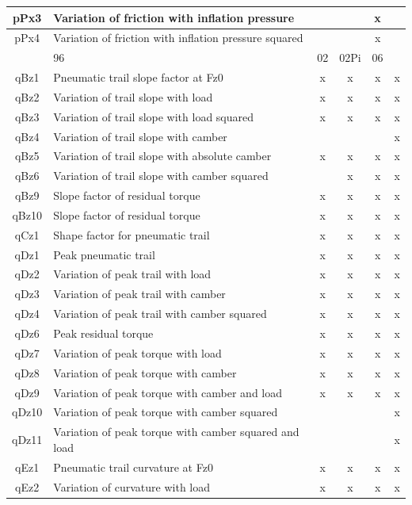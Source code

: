 \begin{center}
\begin{longtable}[c]{|c|p{4in}|cccc|}
			pPx3	&Variation of friction with inflation pressure 			&&&x&	\\ \hline
			pPx4	&Variation of friction with inflation pressure squared	&&&x&	\\ \hline
			\rowcolor{ttblue}\multicolumn{2}{|c|}{\cellcolor{ttblue}\textbf{Aligning Torque}}&96&	02& 02Pi&	06 \\ \hline
			qBz1	&Pneumatic trail slope factor at Fz0	&x	&x 	&x	&x\\ \hline
			qBz2	&Variation of trail slope with load	&x	&x &x	&x\\ \hline
			qBz3	&Variation of trail slope with load squared	&x 	&x	&x	&x\\ \hline
			qBz4	&Variation of trail slope with camber	&&&&x		\\ \hline
			qBz5	&Variation of trail slope with  absolute camber	&x &x	&x	&x\\ \hline
			qBz6	&Variation of trail slope with camber squared		&&x	 &x	&x\\ \hline
			qBz9	&Slope factor of residual torque	&x	&x 	&x	&x\\ \hline
			qBz10	&Slope factor of residual torque	&x	&x	&x	&x\\ \hline
			qCz1	&Shape factor for pneumatic trail	&x	&x 	&x	&x\\ \hline
			qDz1	&Peak pneumatic trail	&x	&x 	&x	&x\\ \hline
			qDz2	&Variation of peak trail with load 	&x	&x &x		&x\\ \hline
			qDz3	&Variation of peak trail with  camber	&x	&x &x	&x\\ \hline
			qDz4	&Variation of peak trail with camber squared	&x &x		&x	&x\\ \hline
			qDz6	&Peak residual torque	&x	&x &x		&x\\ \hline
			qDz7	&Variation of peak torque with load	&x &x	&x		&x\\ \hline
			qDz8	&Variation of peak torque with camber	&x	&x &x		&x\\ \hline
			qDz9	&Variation of peak torque with camber and load	&x &x		&x	&x\\ \hline
			qDz10	&Variation of peak torque with camber squared			&&&&	x\\ \hline
			qDz11	&Variation of peak torque with camber squared and load 		&&&&x\\ \hline
			qEz1	&Pneumatic trail curvature at Fz0	&x	&x &x	&x\\ \hline
			qEz2	&Variation of curvature with load 	&x	&x &x	&x\\ \hline

\end{longtable}
\end{center}
